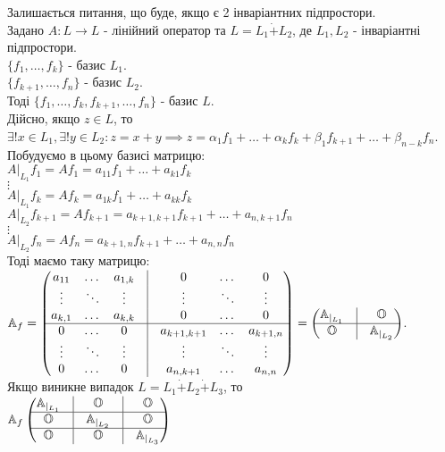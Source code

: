 \documentclass[a4paper, 10pt]{article}
\theoremstyle{theoremdd}
\begin{document}
Залишається питання, що буде, якщо є 2 інваріантних підпростори.\\
Задано $A: L \to L$ - лінійний оператор та $L = L_1 \dot{+} L_2$, де $L_1,L_2$ - інваріантні підпростори.\\
$\{f_1,\dots,f_k\}$ - базис $L_1$.\\
$\{f_{k+1},\dots,f_{n}\}$ - базис $L_2$.\\
Тоді $\{f_1,\dots,f_k,f_{k+1},\dots,f_n\}$ - базис $L$.\\
Дійсно, якщо $z \in L$, то $\exists! x \in L_1, \exists! y \in L_2: z = x + y \implies z = \alpha_1 f_1 + \dots + \alpha_k f_k + \beta_1 f_{k+1} + \dots + \beta_{n-k}f_n$.\\
Побудуємо в цьому базисі матрицю:\\
$A|_{L_1}f_1 = Af_1 = a_{11}f_1 + \dots + a_{k1}f_k$\\
$\vdots$\\
$A|_{L_1}f_k = Af_k = a_{1k}f_1 + \dots + a_{kk}f_k$\\
$A|_{L_2}f_{k+1} = Af_{k+1} = a_{k+1,k+1}f_{k+1} + \dots + a_{n,k+1}f_n$\\
$\vdots$\\
$A|_{L_2}f_n = Af_n = a_{k+1,n}f_{k+1} + \dots + a_{n,n}f_n$\\
Тоді маємо таку матрицю:\\
$\mathbb{A}_f = \begin{pmatrix}
a_{11} & \dots & a_{1,k} & \vline & 0 & \dots & 0 \\
\vdots & \ddots & \vdots & \vline & \vdots & \ddots & \vdots \\
a_{k,1} & \dots & a_{k,k} & \vline & 0 & \dots & 0 \\
\hline
0 & \dots & 0 & \vline & a_{k+1,k+1} & \dots & a_{k+1, n} \\
\vdots & \ddots & \vdots & \vline & \vdots & \ddots & \vdots \\
0 & \dots & 0 & \vline & a_{n,k+1} & \dots & a_{n, n} \\
\end{pmatrix} = \begin{pmatrix}
\mathbb{A}_{|_{L_1}}  & \vline & \mathbb{O} \\
 \hline
 \mathbb{O} & \vline & \mathbb{A}_{|_{L_2}}
\end{pmatrix}$.
\bigskip \\
Якщо виникне випадок $L = L_1 \dot{+} L_2 \dot{+} L_3$, то\\
$\mathbb{A}_f \begin{pmatrix} 
\mathbb{A}_{|_{L_1}}  & \vline & \mathbb{O} & \vline & \mathbb{O} \\
 \hline
\mathbb{O}  & \vline & \mathbb{A}_{|_{L_2}} & \vline & \mathbb{O} \\
 \hline
\mathbb{O}  & \vline & \mathbb{O} & \vline & \mathbb{A}_{|_{L_3}} \\
\end{pmatrix}$
\end{document}
